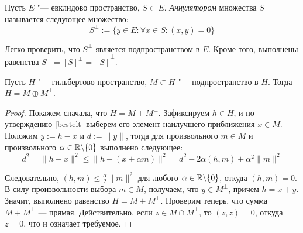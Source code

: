\begin{definition}
	Пусть $E$ "--- евклидово пространство, $S \subset E$. \textit{Аннулятором} множества $S$ называется следующее множество:
	\[S^\perp := \{y \in E: \forall x \in S: (x, y) = 0\}\]
\end{definition}

\begin{note}
	Легко проверить, что $S^\perp$ является подпространством в $E$. Кроме того, выполнены равенства $S^\perp = [S]^\perp = \overline{[S]}^\perp$.
\end{note}

\begin{theorem}\label{thm4.3}
	Пусть $H$ "--- гильбертово пространство, $M \subset H$ "--- под\-пространство в $H$. Тогда $H = M \oplus M^\perp$.
\end{theorem}

\begin{proof}
	Покажем сначала, что $H = M + M^\perp$. Зафиксируем $h \in H$, и по утверждению \ref{bestelt} выберем его элемент наилучшего приближения $x \in M$. Положим $y := h - x$ и $d := \|y\|$, тогда для произвольного $m \in M$ и произвольного $\alpha \in \mathbb{R} \backslash \{0\}$ выполнено следующее:
	\[d^2 = \|h - x\|^2 \le \|h - (x + \alpha m)\|^2 = d^2 - 2\alpha(h, m) + \alpha^2\|m\|^2\]

	Следовательно, $(h, m) \le \frac\alpha2\|m\|^2$ для любого $\alpha \in \mathbb{R} \backslash \{0\}$, откуда $(h, m) = 0$. В силу произвольности выбора $m \in M$, получаем, что $y \in M^\perp$, причем $h = x + y$. Значит, выполнено равенство $H = M + M^\perp$. Проверим теперь, что сумма $M + M^\perp$ --- прямая. Действительно, если $z \in M \cap M^\perp$, то $(z, z) = 0$, откуда $z = 0$, что и означает требуемое.
\end{proof}